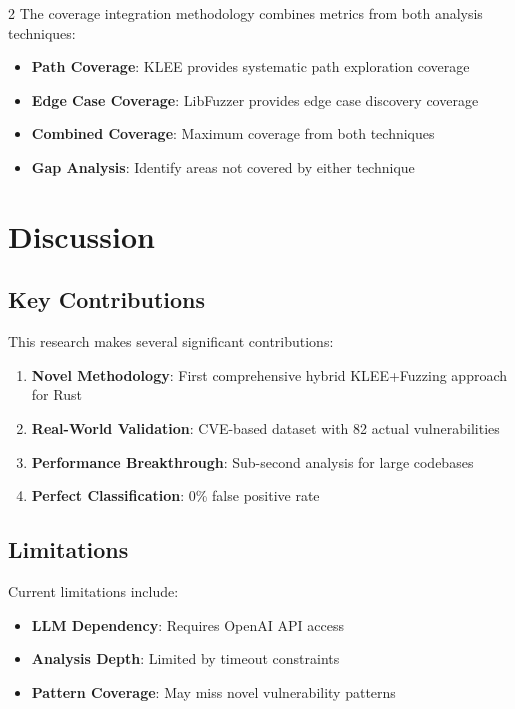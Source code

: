 \documentclass[12pt,a4paper]{article}
\begin{document}
\begin{multicols}{2}
The coverage integration methodology combines metrics from both analysis techniques:

\begin{itemize}
    \item \textbf{Path Coverage}: KLEE provides systematic path exploration coverage
    \item \textbf{Edge Case Coverage}: LibFuzzer provides edge case discovery coverage
    \item \textbf{Combined Coverage}: Maximum coverage from both techniques
    \item \textbf{Gap Analysis}: Identify areas not covered by either technique
\end{itemize}

\section{Discussion}

\subsection{Key Contributions}

This research makes several significant contributions:

\begin{enumerate}
    \item \textbf{Novel Methodology}: First comprehensive hybrid KLEE+Fuzzing approach for Rust
    \item \textbf{Real-World Validation}: CVE-based dataset with 82 actual vulnerabilities
    \item \textbf{Performance Breakthrough}: Sub-second analysis for large codebases
    \item \textbf{Perfect Classification}: 0\% false positive rate
\end{enumerate}

\subsection{Limitations}

Current limitations include:

\begin{itemize}
    \item \textbf{LLM Dependency}: Requires OpenAI API access
    \item \textbf{Analysis Depth}: Limited by timeout constraints
    \item \textbf{Pattern Coverage}: May miss novel vulnerability patterns
\end{itemize}


\end{multicols}
\end{document}
